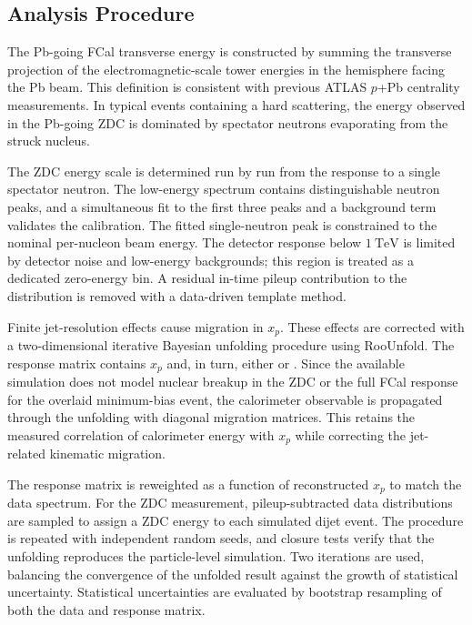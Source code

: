 \subsection{Analysis Procedure}
\label{ssec:unf_strat}

The Pb-going FCal transverse energy is constructed by summing the transverse
projection of the electromagnetic-scale tower energies in the hemisphere facing
the Pb beam. This definition is consistent with previous ATLAS $p$+Pb
centrality measurements. In typical events containing a hard scattering, the
energy observed in the Pb-going ZDC is dominated by spectator neutrons
evaporating from the struck nucleus.

The ZDC energy scale is determined run by run from the response to a single
spectator neutron. The low-energy spectrum contains distinguishable neutron
peaks, and a simultaneous fit to the first three peaks and a background term
validates the calibration. The fitted single-neutron peak is constrained to the
nominal per-nucleon beam energy. The detector response below $1~\mathrm{TeV}$
is limited by detector noise and low-energy backgrounds; this region is treated
as a dedicated zero-energy bin. A residual in-time pileup contribution to the
\EZDC distribution is removed with a data-driven template method.

Finite jet-resolution effects cause migration in $x_p$. These effects are
corrected with a two-dimensional iterative Bayesian unfolding procedure using
RooUnfold. The response matrix contains $x_p$ and, in turn, either \EZDC or
\ETPB. Since the available simulation does not model nuclear breakup in the ZDC
or the full FCal response for the overlaid minimum-bias event, the calorimeter
observable is propagated through the unfolding with diagonal migration
matrices. This retains the measured correlation of calorimeter energy with
$x_p$ while correcting the jet-related kinematic migration.

The response matrix is reweighted as a function of reconstructed $x_p$ to
match the data spectrum. For the ZDC measurement, pileup-subtracted data
distributions are sampled to assign a ZDC energy to each simulated dijet event.
The procedure is repeated with independent random seeds, and closure tests
verify that the unfolding reproduces the particle-level simulation. Two
iterations are used, balancing the convergence of the unfolded result against
the growth of statistical uncertainty. Statistical uncertainties are evaluated
by bootstrap resampling of both the data and response matrix.
